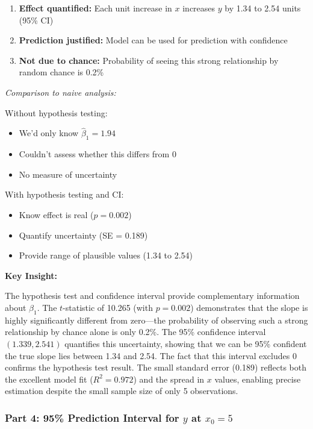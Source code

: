 \documentclass[12pt]{article}
\begin{document}
\begin{explanation}
\begin{enumerate}
    \item \textbf{Effect quantified:} Each unit increase in $x$ increases $y$ by 1.34 to 2.54 units (95\% CI)

    \item \textbf{Prediction justified:} Model can be used for prediction with confidence

    \item \textbf{Not due to chance:} Probability of seeing this strong relationship by random chance is 0.2\%
\end{enumerate}

\textit{Comparison to naive analysis:}

Without hypothesis testing:
\begin{itemize}
    \item We'd only know $\hat{\beta}_1 = 1.94$
    \item Couldn't assess whether this differs from 0
    \item No measure of uncertainty
\end{itemize}

With hypothesis testing and CI:
\begin{itemize}
    \item Know effect is real ($p = 0.002$)
    \item Quantify uncertainty (SE = 0.189)
    \item Provide range of plausible values (1.34 to 2.54)
\end{itemize}

\textbf{Key Insight:}

The hypothesis test and confidence interval provide complementary information about $\beta_1$. The $t$-statistic of 10.265 (with $p = 0.002$) demonstrates that the slope is highly significantly different from zero—the probability of observing such a strong relationship by chance alone is only 0.2\%. The 95\% confidence interval $(1.339, 2.541)$ quantifies this uncertainty, showing that we can be 95\% confident the true slope lies between 1.34 and 2.54. The fact that this interval excludes 0 confirms the hypothesis test result. The small standard error (0.189) reflects both the excellent model fit ($R^2 = 0.972$) and the spread in $x$ values, enabling precise estimation despite the small sample size of only 5 observations.
\end{explanation}

\subsubsection{Part 4: 95\% Prediction Interval for $y$ at $x_0 = 5$}
\end{document}

